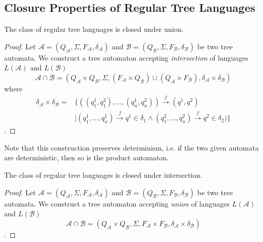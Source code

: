 

\subsection{Closure Properties of Regular Tree Languages}\label{ta-closures}

\begin{theorem}
 The class of regular tree languages is closed under union.
\end{theorem}

\begin{proof}
Let $\mathcal{A} = (Q_\mathcal{A}, \Sigma, F_\mathcal{A}, \delta_\mathcal{A})$
and $\mathcal{B} = (Q_\mathcal{B}, \Sigma, F_\mathcal{B}, \delta_\mathcal{B})$
be two tree automata. We construct a tree automaton accepting
\emph{intersection} of languages $L(\mathcal{A})$ and $L(\mathcal{B})$  
\begin{equation}
\mathcal{A} \cap \mathcal{B}
= (Q_\mathcal{A} \times Q_\mathcal{B}, \Sigma, (F_\mathcal{A} \times
Q_\mathcal{B}) \cup (Q_\mathcal{A} \times F_\mathcal{B}), \delta_\mathcal{A}
\times \delta_\mathcal{B})
\end{equation} where
 \begin{align}
 \delta_\mathcal{A} \times \delta_\mathcal{B} = &\{
 ((q^1_1,q^2_1),\ldots,(q^1_n,q^2_n)) \overset{f}{\longrightarrow} (q^1,
 q^2)\nonumber \\
  & | (q^1_1,\ldots,q^1_n) \overset{f}{\longrightarrow} q^1 \in \delta_1
  \wedge (q^2_1,\ldots,q^2_n) \overset{f}{\longrightarrow} q^2 \in \delta_2)\}
	\end{align}.
\end{proof}

Note that this construction preserves determinism, i.e. if the two given
automata are deterministic, then so is the product automaton.

\begin{theorem}
 The class of regular tree languages is closed under intersection.
\end{theorem}

\begin{proof}
Let $\mathcal{A} = (Q_\mathcal{A}, \Sigma, F_\mathcal{A}, \delta_\mathcal{A})$
and $\mathcal{B} = (Q_\mathcal{B}, \Sigma, F_\mathcal{B}, \delta_\mathcal{B})$
be two tree automata. We construct a tree automaton accepting \emph{union}
of languages $L(\mathcal{A})$ and $L(\mathcal{B})$ 
\begin{equation}
\mathcal{A} \cap
\mathcal{B} = (Q_\mathcal{A} \times Q_\mathcal{B}, \Sigma, F_\mathcal{A} \times
F_\mathcal{B}, \delta_\mathcal{A} \times \delta_\mathcal{B})
\end{equation}.
\end{proof}

